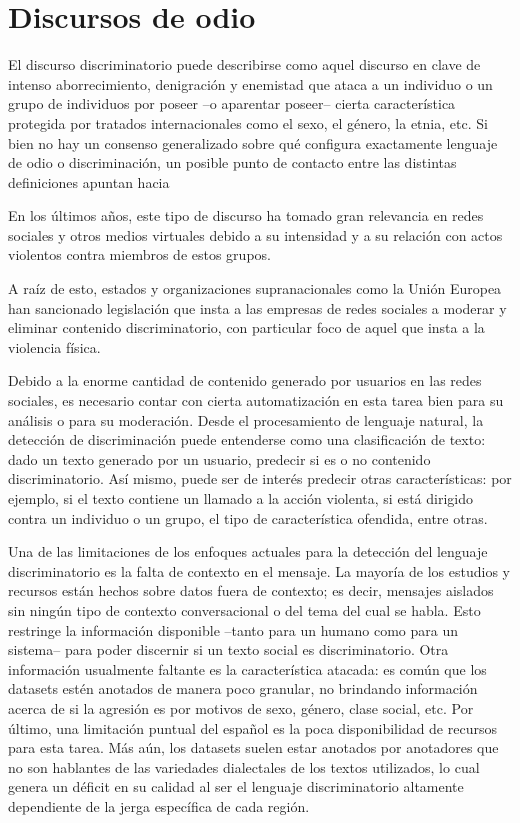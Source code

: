 
\section{Discursos de odio}


El discurso discriminatorio  puede describirse como aquel discurso en clave de intenso aborrecimiento, denigración y enemistad que ataca a un individuo o un grupo de individuos por poseer --o aparentar poseer-- cierta característica protegida por tratados internacionales como el sexo, el género, la etnia, etc. Si bien no hay un consenso generalizado sobre qué configura exactamente lenguaje de odio o discriminación\cite{article192015}, un posible punto de contacto entre las distintas definiciones apuntan hacia


En los últimos años, este tipo de discurso ha tomado gran relevancia en redes sociales y otros medios virtuales debido a su intensidad y a su relación con actos violentos contra miembros de estos grupos.

A raíz de esto, estados y organizaciones supranacionales como la Unión Europea han sancionado legislación que insta a las empresas de redes sociales a moderar y eliminar contenido discriminatorio, con particular foco de aquel que insta a la violencia física.

Debido a la enorme cantidad de contenido generado por usuarios en las redes sociales, es necesario contar con cierta automatización en esta tarea bien para su análisis o para su moderación. Desde el procesamiento de lenguaje natural, la detección de discriminación puede entenderse como una clasificación de texto: dado un texto generado por un usuario, predecir si es o no contenido discriminatorio. Así mismo, puede ser de interés predecir otras características: por ejemplo, si el texto contiene un llamado a la acción violenta, si está dirigido contra un individuo o un grupo, el tipo de característica ofendida, entre otras.

Una de las limitaciones de los enfoques actuales para la detección del lenguaje discriminatorio es la falta de contexto en el mensaje. La mayoría de los estudios y recursos están hechos sobre datos fuera de contexto; es decir, mensajes aislados sin ningún tipo de contexto conversacional o del tema del cual se habla. Esto restringe la información disponible –tanto para un humano como para un sistema– para poder discernir si un texto social es discriminatorio. Otra información usualmente faltante es la característica atacada: es común que los datasets estén anotados de manera poco granular, no brindando información acerca de si la agresión es por motivos de sexo, género, clase social, etc. Por último, una limitación puntual del español es la poca disponibilidad de recursos para esta tarea. Más aún, los datasets suelen estar anotados por anotadores que no son hablantes de las variedades dialectales de los textos utilizados, lo cual genera un déficit en su calidad al ser el lenguaje discriminatorio altamente dependiente de la jerga específica de cada región.


